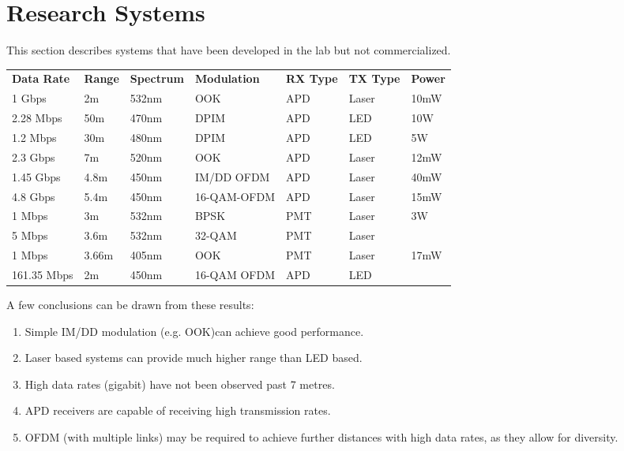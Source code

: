 \section{Research Systems}
This section describes systems that have been developed in the lab but not
commercialized.

\begin{table}[H]
\begin{tabular}{lllllll}
\textbf{Data Rate} & \textbf{Range} & \textbf{Spectrum} & \textbf{Modulation} &
\textbf{RX Type} & \textbf{TX Type} & \textbf{Power} \\
1 Gbps      & 2m     & 532nm & OOK         & APD & Laser & 10mW           \\
2.28 Mbps   & 50m    & 470nm & DPIM        & APD & LED   & 10W            \\
1.2 Mbps    & 30m    & 480nm & DPIM        & APD & LED   & 5W             \\
2.3 Gbps    & 7m     & 520nm & OOK         & APD & Laser & 12mW           \\
1.45 Gbps   & 4.8m   & 450nm & IM/DD OFDM  & APD & Laser & 40mW           \\
4.8 Gbps    & 5.4m   & 450nm & 16-QAM-OFDM & APD & Laser & 15mW           \\
1 Mbps      & 3m     & 532nm & BPSK        & PMT & Laser & 3W             \\
5 Mbps      & 3.6m   & 532nm & 32-QAM      & PMT & Laser &                \\
1 Mbps      & 3.66m  & 405nm & OOK         & PMT & Laser & 17mW           \\
161.35 Mbps & 2m     & 450nm & 16-QAM OFDM & APD & LED  &
\end{tabular}
\end{table}

A few conclusions can be drawn from these results:
\begin{enumerate}
\item Simple IM/DD modulation (e.g. \ac{OOK})can achieve good performance.
\item Laser based systems can provide much higher range than \ac{LED} based.
\item High data rates (gigabit) have not been observed past 7 metres.
\item \ac{APD} receivers are capable of receiving high transmission rates.
\item \ac{OFDM} (with multiple links) may be required to achieve further
distances with high data rates, as they allow for diversity.
\end{enumerate}
